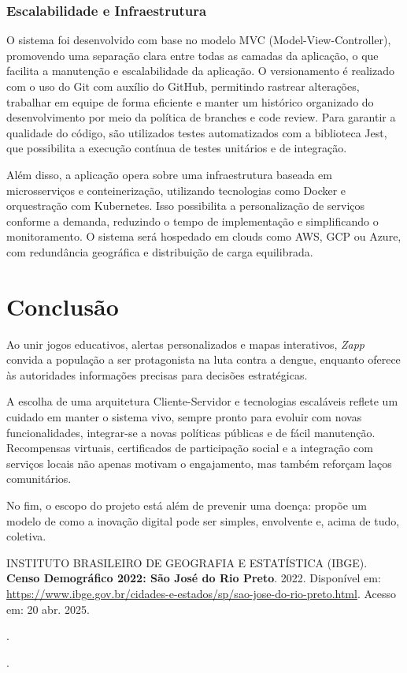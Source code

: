 \documentclass[a4paper, 12pt]{article}
\begin{document}
\subsubsection{Escalabilidade e Infraestrutura}

O sistema foi desenvolvido com base no modelo MVC (Model-View-Controller), promovendo uma separação clara entre todas as camadas da aplicação, o que facilita a manutenção e escalabilidade da aplicação. O versionamento é realizado com o uso do Git com auxílio do GitHub, permitindo rastrear alterações, trabalhar em equipe de forma eficiente e manter um histórico organizado do desenvolvimento por meio da política de branches e code review. Para garantir a qualidade do código, são utilizados testes automatizados com a biblioteca Jest, que possibilita a execução contínua de testes unitários e de integração. 
\par Além disso, a aplicação opera sobre uma infraestrutura baseada em microsserviços e conteinerização, utilizando tecnologias como Docker e orquestração com Kubernetes. Isso possibilita a personalização de serviços conforme a demanda, reduzindo o tempo de implementação e simplificando o monitoramento. O sistema será hospedado em clouds como AWS, GCP ou Azure, com redundância geográfica e distribuição de carga equilibrada.

\newpage
\section{Conclusão}
Ao unir jogos educativos, alertas personalizados e mapas interativos, \textit{Zapp} convida a população a ser protagonista na luta contra a dengue, enquanto oferece às autoridades informações precisas para decisões estratégicas.

A escolha de uma arquitetura Cliente-Servidor e tecnologias escaláveis reflete um cuidado em manter o sistema vivo, sempre pronto para evoluir com novas funcionalidades, integrar-se a novas políticas públicas e de fácil manutenção. Recompensas virtuais, certificados de participação social e a integração com serviços locais não apenas motivam o engajamento, mas também reforçam laços comunitários.

No fim, o escopo do projeto está além de prevenir uma doença: propõe um modelo de como a inovação digital pode ser simples, envolvente e, acima de tudo, coletiva.

\newpage
\renewcommand{\refname}{Bibliografia}
\begin{thebibliography}{09}
 INSTITUTO BRASILEIRO DE GEOGRAFIA E ESTATÍSTICA (IBGE). 
\textbf{Censo Demográfico 2022: São José do Rio Preto}. 
2022. 
Disponível em: \url{https://www.ibge.gov.br/cidades-e-estados/sp/sao-jose-do-rio-preto.html}. 
Acesso em: 20 abr. 2025.

\bibitem{} %
\textbf{}. %

\bibitem{} %
\textbf{}. %

\end{thebibliography}
\end{document}
